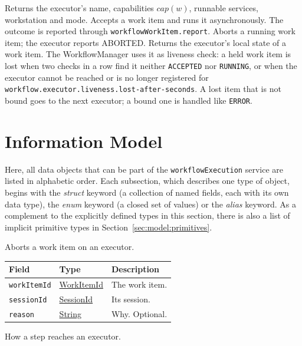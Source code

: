 \documentclass[a4paper]{arrowhead}
\newcommand{\pref}[1]{{\textcolor{ArrowheadGrey}{\hyperref[sec:model:primitives:#1]{#1}}}}
\begin{document}
Returns the executor's name, capabilities $cap(w)$, runnable services, workstation and mode.
Accepts a work item and runs it asynchronously. The outcome is reported through \texttt{workflow\allowbreak{}Work\allowbreak{}Item.\allowbreak{}report}.
Aborts a running work item; the executor reports ABORTED.
Returns the executor's local state of a work item. The WorkflowManager uses it as liveness check: a held work item is lost when two checks in a row find it neither \texttt{ACCEPTED} nor \texttt{RUNNING}, or when the executor cannot be reached or is no longer registered for \texttt{workflow.\allowbreak{}executor.\allowbreak{}liveness.\allowbreak{}lost-\allowbreak{}after-\allowbreak{}seconds}. A lost item that is not bound goes to the next executor; a bound one is handled like \texttt{ERROR}.

\newpage
\section{Information Model}
\label{sec:model}
Here, all data objects that can be part of the \texttt{workflow\allowbreak{}Execution} service are listed in alphabetic order. Each
subsection, which describes one type of object, begins with the \textit{struct} keyword (a collection of named fields,
each with its own data type), the \textit{enum} keyword (a closed set of values) or the \textit{alias} keyword. As a
complement to the explicitly defined types in this section, there is also a list of implicit primitive types in
Section~\ref{sec:model:primitives}.

Aborts a work item on an executor.

{\small
\begin{longtable}{|p{3.9cm}|p{4.4cm}|p{7.5cm}|}

\hline
\rowcolor{gray!33} Field & Type & Description \\ \hline
\endhead
\texttt{workItemId} & \pref{WorkItemId} & The work item. \\ \hline
\texttt{sessionId} & \pref{SessionId} & Its session. \\ \hline
\texttt{reason} & \pref{String} & Why. Optional. \\ \hline
\end{longtable}
}

How a step reaches an executor.
\end{document}
